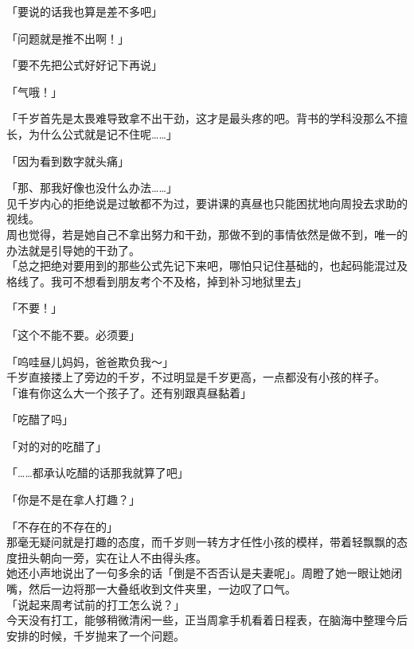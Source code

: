 「要说的话我也算是差不多吧」

「问题就是推不出啊！」

「要不先把公式好好记下再说」

「气哦！」

「千岁首先是太畏难导致拿不出干劲，这才是最头疼的吧。背书的学科没那么不擅长，为什么公式就是记不住呢……」

「因为看到数字就头痛」

「那、那我好像也没什么办法……」\\

见千岁内心的拒绝说是过敏都不为过，要讲课的真昼也只能困扰地向周投去求助的视线。\\

周也觉得，若是她自己不拿出努力和干劲，那做不到的事情依然是做不到，唯一的办法就是引导她的干劲了。\\

「总之把绝对要用到的那些公式先记下来吧，哪怕只记住基础的，也起码能混过及格线了。我可不想看到朋友考个不及格，掉到补习地狱里去」

「不要！」

「这个不能不要。必须要」

「呜哇昼儿妈妈，爸爸欺负我～」\\

千岁直接搂上了旁边的千岁，不过明显是千岁更高，一点都没有小孩的样子。\\

「谁有你这么大一个孩子了。还有别跟真昼黏着」

「吃醋了吗」

「对的对的吃醋了」

「……都承认吃醋的话那我就算了吧」

「你是不是在拿人打趣？」

「不存在的不存在的」\\

那毫无疑问就是打趣的态度，而千岁则一转方才任性小孩的模样，带着轻飘飘的态度扭头朝向一旁，实在让人不由得头疼。\\

她还小声地说出了一句多余的话「倒是不否否认是夫妻呢」。周瞪了她一眼让她闭嘴，然后一边将那一大叠纸收到文件夹里，一边叹了口气。\\

「说起来周考试前的打工怎么说？」\\

今天没有打工，能够稍微清闲一些，正当周拿手机看着日程表，在脑海中整理今后安排的时候，千岁抛来了一个问题。\\

